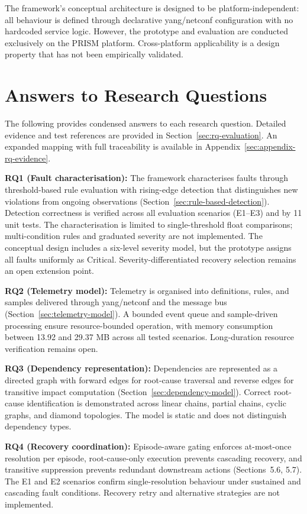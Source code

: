 The framework's conceptual architecture is designed to be platform-independent: all behaviour is defined through declarative \gls{yang}/\gls{netconf} configuration with no hardcoded service logic. However, the prototype and evaluation are conducted exclusively on the PRISM platform. Cross-platform applicability is a design property that has not been empirically validated.

\section{Answers to Research Questions}\label{sec:rq-answers}

The following provides condensed answers to each research question. Detailed evidence and test references are provided in Section~\ref{sec:rq-evaluation}. An expanded mapping with full traceability is available in Appendix~\ref{sec:appendix-rq-evidence}.

\textbf{RQ1 (Fault characterisation):} The framework characterises faults through threshold-based rule evaluation with rising-edge detection that distinguishes new violations from ongoing observations (Section~\ref{sec:rule-based-detection}). Detection correctness is verified across all evaluation scenarios (E1--E3) and by 11 unit tests. The characterisation is limited to single-threshold float comparisons; multi-condition rules and graduated severity are not implemented. The conceptual design includes a six-level severity model, but the prototype assigns all faults uniformly as Critical. Severity-differentiated recovery selection remains an open extension point.

\textbf{RQ2 (Telemetry model):} Telemetry is organised into definitions, rules, and samples delivered through \gls{yang}/\gls{netconf} and the message bus (Section~\ref{sec:telemetry-model}). A bounded event queue and sample-driven processing ensure resource-bounded operation, with memory consumption between 13.92 and 29.37 MB across all tested scenarios. Long-duration resource verification remains open.

\textbf{RQ3 (Dependency representation):} Dependencies are represented as a directed graph with forward edges for root-cause traversal and reverse edges for transitive impact computation (Section~\ref{sec:dependency-model}). Correct root-cause identification is demonstrated across linear chains, partial chains, cyclic graphs, and diamond topologies. The model is static and does not distinguish dependency types.

\textbf{RQ4 (Recovery coordination):} Episode-aware gating enforces at-most-once resolution per episode, root-cause-only execution prevents cascading recovery, and transitive suppression prevents redundant downstream actions (Sections~5.6, 5.7). The E1 and E2 scenarios confirm single-resolution behaviour under sustained and cascading fault conditions. Recovery retry and alternative strategies are not implemented.

